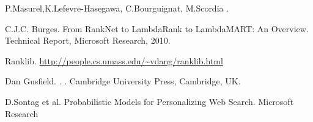 \documentclass[11pt,letterpaper]{article}
\begin{document}
\begin{thebibliography}{}


P.Masurel,K.Lefevre-Hasegawa, C.Bourguignat, M.Scordia 
.


\bibitem[2] C.J.C. Burges. From RankNet to LambdaRank to
LambdaMART: An Overview. Technical Report, Microsoft Research, 2010.

\bibitem[3] Ranklib.
\url{http://people.cs.umass.edu/~vdang/ranklib.html}

Dan Gusfield.
.
.
\newblock Cambridge University Press, Cambridge, UK.

\bibitem[4] D.Sontag et al. Probabilistic Models for Personalizing Web Search.
Microsoft Research


\end{thebibliography}
\end{document}
